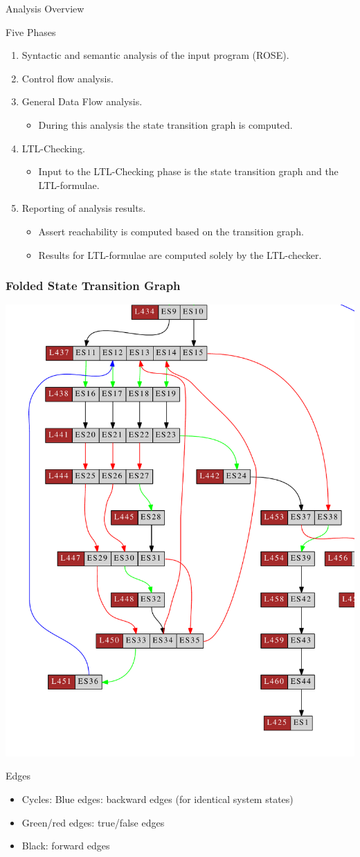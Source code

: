 \begin{frame}{Analysis Overview}

\begin{block}{Five Phases}
\begin{enumerate}
\item Syntactic and semantic analysis of the input program (ROSE).
\item Control flow analysis.
\item General Data Flow analysis.
\begin{itemize}
\item During this analysis the state transition graph is computed.
\end{itemize}
\item LTL-Checking. 
\begin{itemize}
\item Input to the LTL-Checking phase is the state transition graph and the LTL-formulae.
\end{itemize}
\item Reporting of analysis results. 
\begin{itemize}
\item Assert reachability is computed based on the transition graph.
\item Results for LTL-formulae are computed solely by the LTL-checker.
\end{itemize}
\end{enumerate}

\end{block}
\end{frame}

\begin{frame}[fragile]
\frametitle{Folded State Transition Graph}

\includegraphics[width=0.4\columnwidth]{../manual/gfx/basictest10f_transitiongraph2}

\vspace{-0.3cm}
{
\scriptsize
\begin{block}{Edges}
\begin{itemize}
\item Cycles: Blue edges: backward edges (for identical system states)
\item Green/red edges: true/false edges
\item Black: forward edges
\end{itemize}
\end{block}
}

\end{frame}

